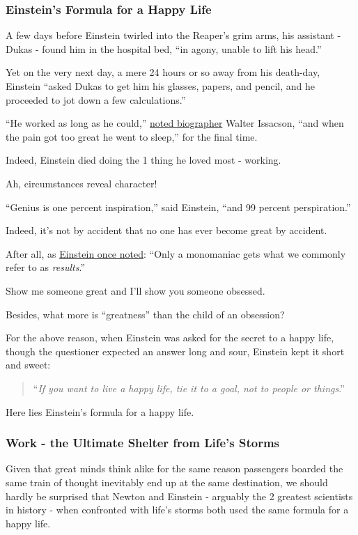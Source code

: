 \documentclass{article}
\begin{document}
\subsubsection{Einstein's Formula for a Happy Life}
A few days before Einstein twirled into the Reaper's grim arms, his assistant - Dukas - found him in the hospital bed, ``in agony, unable to lift his head.''

%
Yet on the very next day, a mere 24 hours or so away from his death-day, Einstein ``asked Dukas to get him his glasses, papers, and pencil, and he proceeded to jot down a few calculations.''

%
``He worked as long as he could,'' \href{https://workbooks.colombo.ca/issue-37-15-april-2020/}{noted biographer} Walter Issacson, ``and when the pain got too great he went to sleep,'' for the final time.

Indeed, Einstein died doing the 1 thing he loved most - working.

Ah, circumstances reveal character!

%
``Genius is one percent inspiration,'' said Einstein, ``and 99 percent perspiration.''

Indeed, it's not by accident that no one has ever become great by accident.

After all, as \href{https://www.newyorker.com/magazine/1947/11/22/the-great-foreigner}{Einstein once noted}: ``Only a monomaniac gets what we commonly refer to as \textit{results}.''

%
Show me someone great and I'll show you someone obsessed.

Besides, what more is ``greatness'' than the child of an obsession?

%
For the above reason, when Einstein was asked for the secret to a happy life, though the questioner expected an answer long and sour, Einstein kept it short and sweet:
\begin{quotation}
	``\textit{If you want to live a happy life, tie it to a goal, not to people or things}.''
\end{quotation}
Here lies Einstein's formula for a happy life.

\subsubsection{Work - the Ultimate Shelter from Life's Storms}
Given that great minds think alike for the same reason passengers boarded the same train of thought inevitably end up at the same destination, we should hardly be surprised that Newton and Einstein - arguably the 2 greatest scientists in history - when confronted with life's storms both used the same formula for a happy life.
\end{document}
